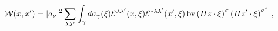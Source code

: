 \begin{equation}
 {\cal W}(x,x')=
\vert
a_{\nu}\vert^{2}\sum_{\lambda\lambda'}\int_{\gamma}d\sigma_{\gamma}(\xi)
{\cal E}^{\lambda\lambda'}(x,\xi) {\cal
E}^{*\lambda\lambda'}(x',\xi) \,\mbox{bv} \left(H
z\cdot\xi\right)^{\sigma} \left(H z'\cdot\xi\right)^{\sigma^*} \,,
\end{equation}

